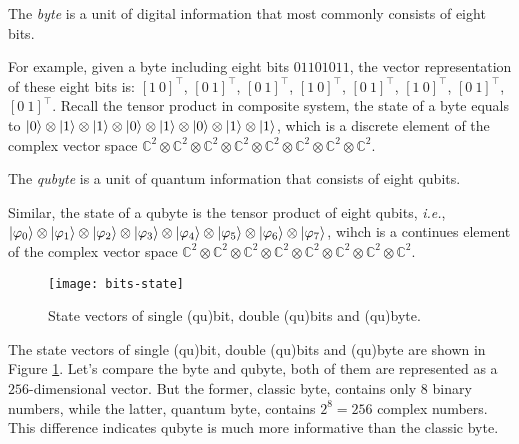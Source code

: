 \documentclass{easyclass}
\begin{document}
\begin{definition}[Byte]
	The \textit{byte} is a unit of digital information that most commonly consists of eight bits.
\end{definition}

For example, given a byte including eight bits $01101011$, the vector representation of these eight bits is: $[1\ 0]^{\top}$, $[0\ 1]^{\top}$, $[0\ 1]^{\top}$, $[1\ 0]^{\top}$,  $[0\ 1]^{\top}$,  $[1\ 0]^{\top}$, $[0\ 1]^{\top}$,  $[0\ 1]^{\top}$. Recall the tensor product in composite system, the state of a byte equals to $\ket{0}\otimes \ket{1}\otimes \ket{1}\otimes \ket{0}\otimes \ket{1}\otimes \ket{0}\otimes \ket{1}\otimes \ket{1}$, which is a discrete element of the complex vector space $\mathbb{C}^2\otimes\mathbb{C}^2\otimes\mathbb{C}^2\otimes\mathbb{C}^2\otimes\mathbb{C}^2\otimes\mathbb{C}^2\otimes\mathbb{C}^2\otimes\mathbb{C}^2$.

\begin{definition}[Qubyte]
	The \textit{qubyte} is a unit of quantum information that consists of eight qubits.
\end{definition}

Similar, the state of a qubyte is the tensor product of eight qubits, \textit{i.e.}, $\ket{\varphi_0}\otimes\ket{\varphi_1}\otimes\ket{\varphi_2}\otimes\ket{\varphi_3}\otimes\ket{\varphi_4}\otimes\ket{\varphi_5}\otimes\ket{\varphi_6}\otimes\ket{\varphi_7}$, wihch is a continues element of the complex vector space $\mathbb{C}^2\otimes\mathbb{C}^2\otimes\mathbb{C}^2\otimes\mathbb{C}^2\otimes\mathbb{C}^2\otimes\mathbb{C}^2\otimes\mathbb{C}^2\otimes\mathbb{C}^2$.

\begin{figure}[h]
	\centering
	\texttt{[image: bits-state]}
	\caption{State vectors of single (qu)bit, double (qu)bits and (qu)byte.}
	\label{fig:bits-state}
\end{figure}

The state vectors of single (qu)bit, double (qu)bits and (qu)byte are shown in Figure \ref{fig:bits-state}. Let's compare the byte and qubyte, both of them are represented as a $256$-dimensional vector. But the former, classic byte, contains only $8$ binary numbers, while the latter, quantum byte, contains $2^8=256$ complex numbers. This difference indicates qubyte is much more informative than the classic byte.
\end{document}
